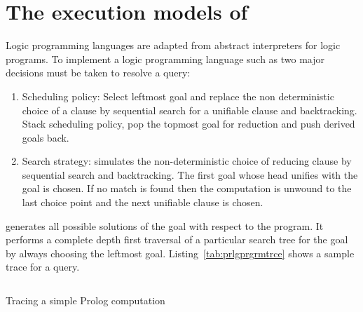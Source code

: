\documentclass[proposal.tex]{subfiles}
\begin{document}
\section[{The execution models of \progLang{Prolog}}]{The execution models of  \cite{Sterling:1994:APA:175753}
}\label{sec:exec-models-prolog}
Logic programming languages are adapted from abstract interpreters for logic programs. 
To implement a logic programming language such as  two major decisions must be taken to resolve a query:
\begin{enumerate}
\item Scheduling policy:
Select leftmost goal and replace the non deterministic choice of a clause by sequential search for a unifiable clause and backtracking. 
Stack scheduling policy, pop the topmost goal for reduction and push derived goals back.

\item Search strategy:
 simulates the non-deterministic choice of reducing clause by sequential search and backtracking. The first goal whose 
head unifies with the goal is chosen. If no match is found then the computation is unwound to the last choice point and the next unifiable 
clause is chosen.
\end{enumerate}

 generates all possible solutions of the goal with respect to the  program. It performs a complete
depth first traversal of a particular search tree for the goal by always choosing the leftmost goal. Listing~\ref{tab:prlgprgrmtrce} shows
a sample trace for a query.

\begin{code-list}[H]
  \begin{singlespace}
    \inputminted[linenos]{prolog}{prologprogramtrace.pl}
  \end{singlespace}
  \caption{Tracing a simple Prolog computation \cite{Sterling:1994:APA:175753}}
\label{tab:prlgprgrmtrce}
\end{code-list}
\end{document}
